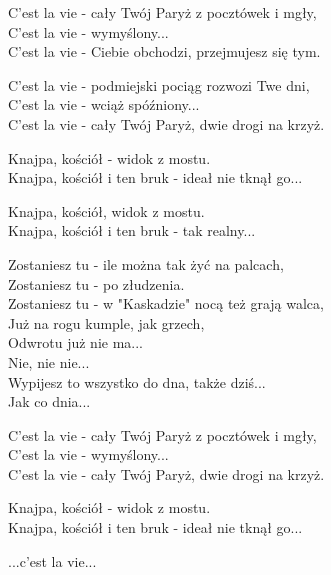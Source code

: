 \begin{text}
    C'est la vie - cały Twój Paryż z pocztówek i mgły,\\
    C'est la vie - wymyślony...\\
    C'est la vie - Ciebie obchodzi, przejmujesz się tym.

    C'est la vie - podmiejski pociąg rozwozi Twe dni,\\
    C'est la vie - wciąż spóźniony...\\
    C'est la vie - cały Twój Paryż, dwie drogi na krzyż.

    Knajpa, kościół - widok z mostu.\\
    Knajpa, kościół i ten bruk - ideał nie tknął go...

    Knajpa, kościół, widok z mostu.\\
    Knajpa, kościół i ten bruk - tak realny...

    Zostaniesz tu - ile można tak żyć na palcach,\\
    Zostaniesz tu - po złudzenia.\\
    Zostaniesz tu - w "Kaskadzie" nocą też grają walca,\\
    Już na rogu kumple, jak grzech,\\
    Odwrotu już nie ma...\\
    Nie, nie nie...\\
    Wypijesz to wszystko do dna, także dziś...\\
    Jak co dnia...

    C'est la vie - cały Twój Paryż z pocztówek i mgły,\\
    C'est la vie - wymyślony...\\
    C'est la vie - cały Twój Paryż, dwie drogi na krzyż.

    Knajpa, kościół - widok z mostu.\\
    Knajpa, kościół i ten bruk - ideał nie tknął go...

    ...c'est la vie...
\end{text}
\begin{chord}

\end{chord}